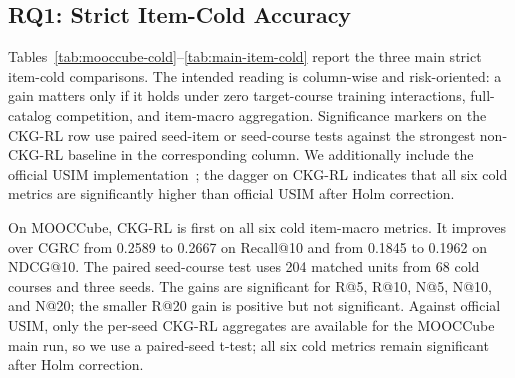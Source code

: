 \documentclass[sigconf,anonymous,review]{acmart}
\begin{document}
\subsection{RQ1: Strict Item-Cold Accuracy}
Tables~\ref{tab:mooccube-cold}--\ref{tab:main-item-cold} report the three main strict item-cold comparisons. The intended reading is column-wise and risk-oriented: a gain matters only if it holds under zero target-course training interactions, full-catalog competition, and item-macro aggregation. Significance markers on the CKG-RL row use paired seed-item or seed-course tests against the strongest non-CKG-RL baseline in the corresponding column. We additionally include the official USIM implementation~\cite{zhao2024usim}; the dagger on CKG-RL indicates that all six cold metrics are significantly higher than official USIM after Holm correction.

On MOOCCube, CKG-RL is first on all six cold item-macro metrics. It improves over CGRC from 0.2589 to 0.2667 on Recall@10 and from 0.1845 to 0.1962 on NDCG@10. The paired seed-course test uses 204 matched units from 68 cold courses and three seeds. The gains are significant for R@5, R@10, N@5, N@10, and N@20; the smaller R@20 gain is positive but not significant. Against official USIM, only the per-seed CKG-RL aggregates are available for the MOOCCube main run, so we use a paired-seed t-test; all six cold metrics remain significant after Holm correction.
\end{document}
